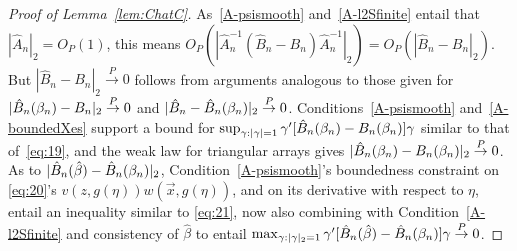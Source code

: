 \documentclass{article}
\theoremstyle{remark}
\begin{document}
\begin{proof}[Proof of Lemma~\ref{lem:ChatC}]
As~\ref{A-psismooth} and~\ref{A-l2Sfinite} entail that $|\hat{A}_{n}|_{2} = O_{P}(1)$, this means $O_{P}(|\hat{A}_{n}^{-1}(\hat{B}_{n} - B_{n}) \hat{A}_{n}^{-1}|_{2}) = O_{P}(|\hat{B}_{n} - B_{n}|_{2})$. But $|\hat{B}_{n} - B_{n}|_{2} \stackrel{P}{\rightarrow} 0$ follows from arguments analogous to those given for %
$|\hat{B}_{n}(\beta_{n }) - B_{n}|_{2} \stackrel{P}{\rightarrow} 0$ and $|\hat{B}_{n} - \hat{B}_{n}(\beta_{n })|_{2} \stackrel{P}{\rightarrow} 0$.   Conditions~\ref{A-psismooth}  and~\ref{A-boundedXes} support a bound for $\sup_{\gamma: |\gamma|=1}\gamma'[\hat{B}_{n}(\beta_{n }) - B_{n}(\beta_{n })]\gamma$ similar to that of~\eqref{eq:19}, and the weak law for triangular arrays gives $|\hat{B}_{n}(\beta_{n }) - B_{n}(\beta_{n })|_{2} \stackrel{P}{\rightarrow} 0$.   As to $|\hat{B}_{n}(\hat\beta) - \hat{B}_{n}(\beta_{n })|_{2}$, Condition~\ref{A-psismooth}'s boundedness constraint on \eqref{eq:20}'s $v(z, g(\eta))w(\vec{x}, g(\eta))$, and on its derivative with respect to $\eta$, entail an inequality similar to \eqref{eq:21}, now also combining with Condition~\ref{A-l2Sfinite} and consistency of $\hat\beta$ to entail $\max_{\gamma: |\gamma|_{2}=1} \gamma'[\hat{B}_{n}(\hat\beta) - \hat{B}_{n}(\beta_{n }) ]\gamma \stackrel{P}{\rightarrow} 0$.
\end{proof}
\end{document}
